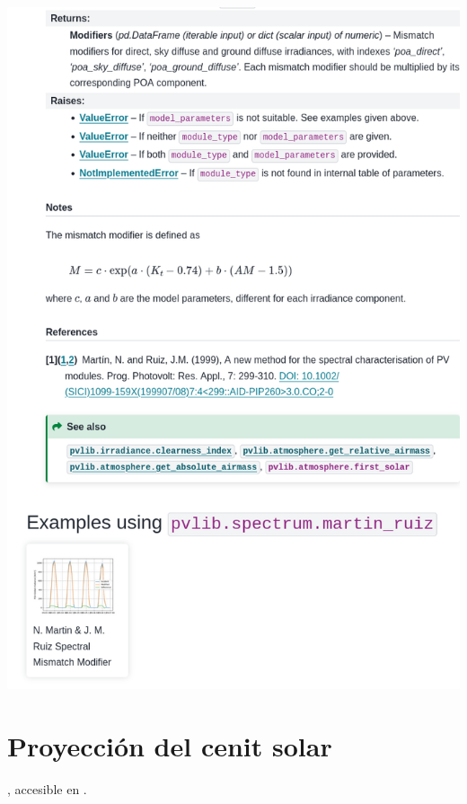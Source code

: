 \begin{myparindent}{0pt}
\includegraphics[width=\linewidth,height=0.9\textheight,keepaspectratio]{images/docs_funcs_cut/martin_ruiz_1.png}

\newpage\section{Proyección del cenit solar} \label{sct:doc_proyeccion_cenit}

, accesible en .


\end{myparindent}
